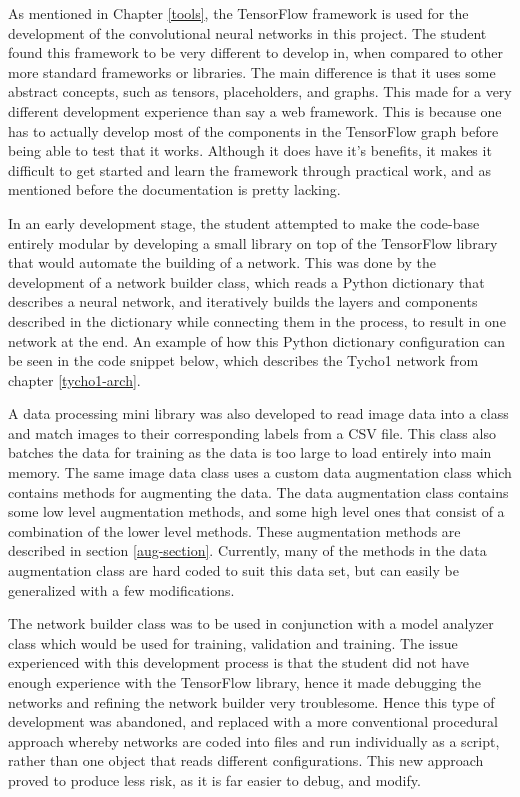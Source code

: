 \documentclass[12pt,a4paper,oneside,oldfontcommands]{memoir}
\begin{document}
\begin{Declaration Of OriginalityOrginality}
As mentioned in Chapter \ref{tools}, the TensorFlow framework is used for the development of the convolutional neural networks in this project. The student found this framework to be very different to develop in, when compared to other more standard frameworks or libraries. The main difference is that it uses some abstract concepts, such as tensors, placeholders, and graphs. This made for a very different development experience than say a web framework. This is because one has to actually develop most of the components in the TensorFlow graph before being able to test that it works. Although it does have it's benefits, it makes it difficult to get started and learn the framework through practical work, and as mentioned before the documentation is pretty lacking.

In an early development stage, the student attempted to make the code-base entirely modular by developing a small library on top of the TensorFlow library that would automate the building of a network. This was done by the development of a network builder class, which reads a Python dictionary that describes a neural network, and iteratively builds the layers and components described in the dictionary while connecting them in the process, to result in one network at the end. An example of how this Python dictionary configuration can be seen in the code snippet below, which describes the Tycho1 network from chapter \ref{tycho1-arch}.




A data processing mini library was also developed to read image data into a class and match images to their corresponding labels from a CSV file. This class also batches the data for training as the data is too large to load entirely into main memory. The same image data class uses a custom data augmentation class which contains methods for augmenting the data. The data augmentation class contains some low level augmentation methods, and some high level ones that consist of a combination of the lower level methods. These augmentation methods are described in section \ref{aug-section}. Currently, many of the methods in the data augmentation class are hard coded to suit this data set, but can easily be generalized with a few modifications. 

The network builder class was to be used in conjunction with a model analyzer class which would be used for training, validation and training. The issue experienced with this development process is that the student did not have enough experience with the TensorFlow library, hence it made debugging the networks and refining the network builder very troublesome. Hence this type of development was abandoned, and replaced with a more conventional procedural approach whereby networks are coded into files and run individually as a script, rather than one object that reads different configurations. This new approach proved to produce less risk, as it is far easier to debug, and modify.


\end{Declaration Of OriginalityOrginality}
\end{document}
